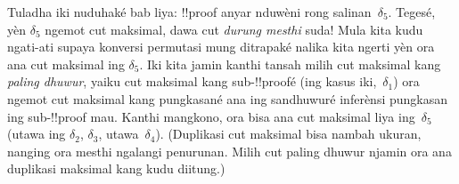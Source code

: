 \documentclass[../../../include/open-logic-section]{subfiles}
\begin{document}
Tuladha iki nuduhaké bab liya: !!{proof} anyar nduwèni rong
salinan~$\delta_5$. Tegesé, yèn $\delta_5$ ngemot cut maksimal,
dawa cut \emph{durung mesthi} suda! Mula kita kudu ngati-ati supaya
konversi permutasi mung ditrapaké nalika kita ngerti yèn ora ana
cut maksimal ing $\delta_5$. Iki kita jamin kanthi tansah milih
cut maksimal kang \emph{paling dhuwur}, yaiku cut maksimal kang
sub-!!{proof}é (ing kasus iki,~$\delta_1$) ora ngemot cut maksimal
kang pungkasané ana ing sandhuwuré inferènsi pungkasan ing
sub-!!{proof} mau. Kanthi mangkono, ora bisa ana cut maksimal
liya ing~$\delta_5$ (utawa ing $\delta_2$, $\delta_3$,
utawa~$\delta_4$).
(Duplikasi cut maksimal bisa nambah ukuran, nanging ora mesthi ngalangi penurunan. Milih cut paling dhuwur njamin ora ana duplikasi maksimal kang kudu diitung.)
\end{document}
